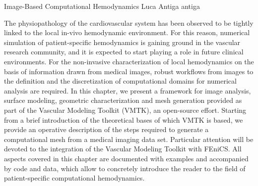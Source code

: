               {Image-Based Computational Hemodynamics}
              {Luca Antiga}
              {antiga}

The physiopathology of the cardiovascular system has been observed to  
be tightly linked to the local in-vivo hemodynamic environment. For  
this reason, numerical simulation of patient-specific hemodynamics is  
gaining ground in the vascular research community, and it is expected  
to start playing a role in future clinical environments.
For the non-invasive characterization of local hemodynamics on the  
basis of information drawn from medical images, robust workflows from  
images to the definition and the discretization of computational  
domains for numerical analysis are required.
In this chapter, we present a framework for image analysis, surface  
modeling, geometric characterization and mesh generation provided as  
part of the Vascular Modeling Toolkit (VMTK), an open-source effort.
Starting from a brief introduction of the theoretical bases of which  
VMTK is based, we provide an operative description of the steps  
required to generate a computational mesh from a medical imaging data  
set. Particular attention will be devoted to the integration of the  
Vascular Modeling Toolkit with FEniCS. All aspects covered in this  
chapter are documented with examples and accompanied by code and  
data, which allow to concretely introduce the reader to the field of  
patient-specific computational hemodynamics.



